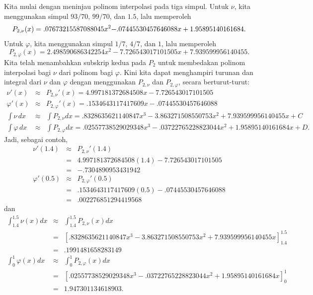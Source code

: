 Kita mulai dengan meninjau polinom interpolasi pada tiga simpul. Untuk
$\nu$, kita menggunakan simpul $93/70$, $99/70$, dan $1.5$, lalu
memperoleh
\[
P_{2,\nu}(x)=.07673215587088045x^{2}\text{\textminus}.07445530457646088x+1.95895140161684.
\]
Untuk $\varphi$, kita menggunakan simpul $1/7$, $4/7$, dan $1$,
lalu memperoleh
\[
P_{2,\varphi}(x)=2.498590686342254x^{2}-7.726543017101505x+7.939599956140455.
\]
Kita telah menambahkan subskrip kedua pada $P_{2}$ untuk membedakan
polinom interpolasi bagi $\nu$ dari polinom bagi $\varphi$. Kini
kita dapat menghampiri turunan dan integral dari $\nu$ dan $\varphi$
dengan menggunakan $P_{2,\nu}$ dan $P_{2,\varphi}$, secara berturut-turut:
\begin{eqnarray*}
\nu'(x) & \approx & P_{2,\nu}'(x)=4.997181372684508x-7.726543017101505\\
\varphi'(x) & \approx & P_{2,\varphi}'(x)=.1534643117417609x-.07445530457646088\\
\int\nu\,dx & \approx & \int P_{2,\nu}dx=.8328635621140847x^{3}-3.863271508550753x^{2}+7.939599956140455x+C\\
\int\varphi\,dx & \approx & \int P_{2,\varphi}dx=.02557738529029348x^{3}-.03722765228823044x^{2}+1.95895140161684x+D.
\end{eqnarray*}
Jadi, sebagai contoh,
\begin{eqnarray*}
\nu'(1.4) & \approx & P_{2,\nu}'(1.4)\\
 & = & 4.997181372684508(1.4)-7.726543017101505\\
 & = & -.7304890953431942\\
\varphi'(0.5) & \approx & P_{2,\varphi}'(0.5)\\
 & = & .1534643117417609(0.5)-.07445530457646088\\
 & = & .002276851294419568
\end{eqnarray*}
 dan 
\begin{eqnarray*}
\int_{1.4}^{1.5}\nu(x)dx & \approx & \int_{1.4}^{1.5}P_{2,\nu}(x)dx\\
 & = & \left[.8328635621140847x^{3}-3.863271508550753x^{2}+7.939599956140455x\right]_{1.4}^{1.5}\\
 & = & .1991481658283149\\
\int_{0}^{1}\varphi(x)dx & \approx & \int_{0}^{1}P_{2,\varphi}(x)dx\\
 & = & \left[.02557738529029348x^{3}-.03722765228823044x^{2}+1.95895140161684x\right]_{0}^{1}\\
 & = & 1.947301134618903.
\end{eqnarray*}


